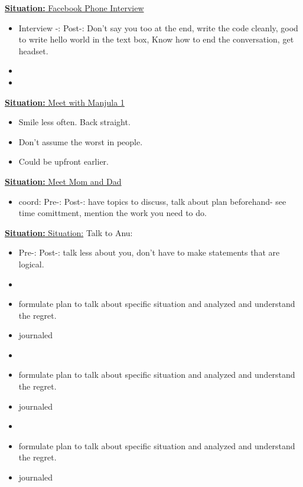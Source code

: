 \documentclass[11pt]{article}
\newcommand{\newSituation}[1]{\underline{\textbf{Situation:} #1} }
\begin{document}
{\newSituation{Facebook Phone Interview} 
\begin{itemize}
\item Interview -:   Post-: Don’t say you too at the end, write the
  code cleanly, good to write hello world in the text box, Know how to
  end the conversation, get headset. 
\item 
\item
\end{itemize}


\newSituation{Meet with Manjula 1} 
\begin{itemize} 
\tiny \item \tiny Smile less often. Back straight. 
\item \tiny Don't assume the worst in people. 
\item \tiny Could be upfront earlier.  
\end{itemize} 


\newSituation{Meet Mom and Dad} 
\begin{itemize}
\item \tiny  coord: 
Pre-:  Post-: have topics to discuss, talk about plan beforehand- see time comittment, mention the work you need to do.
\end{itemize} 


\newSituation{Situation:} Talk to Anu: 
\begin{itemize} 
\item \tiny Pre-:   Post-:  talk less about you, don't have to make statements that are logical. 
\end{itemize}



\begin{itemize}
\item \tiny 
\tiny \item \tiny formulate plan to talk about specific situation and
analyzed and understand the regret. 
\item \tiny journaled 
\end{itemize}

\begin{itemize}
\item \tiny 
\tiny \item \tiny formulate plan to talk about specific situation and
analyzed and understand the regret. 
\item \tiny journaled 
\end{itemize}


\begin{itemize}
\item \tiny 
\tiny \item \tiny formulate plan to talk about specific situation and
analyzed and understand the regret. 
\item \tiny journaled 
\end{itemize}

}
\end{document}
